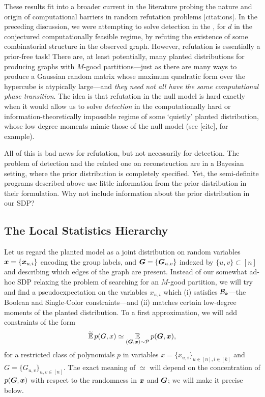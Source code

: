 These results fit into a broader current in the literature probing the nature and origin of computational barriers in random refutation problems [citations]. In the preceding discussion, we were attempting to solve detection in the \model, for $d$ in the conjectured computationally feasible regime, by refuting the existence of some combinatorial structure in the observed graph. However, refutation is essentially a prior-free task! 
There are, at least potentially, many planted distributions for producing graphs with $M$-good partitions---just as there are many ways to produce a Gaussian random matrix whose maximum quadratic form over the hypercube is atypically large---and \emph{they need not all have the same computational phase transition}. The idea is that refutation in the null model is hard exactly when it would allow us to solve \emph{detection} in the computationally hard or information-theoretically impossible regime of some `quietly' planted distribution, whose low degree moments mimic those of the null model (see [cite], for example). 

All of this is bad news for refutation, but not necessarily for detection.  The problem of detection and the related one on reconstruction are in a Bayesian setting, where the prior distribution is completely specified.
Yet, the semi-definite programs described above use little information from the prior distribution in their formulation.  Why not include information about the prior distribution in our SDP?



\subsection{The Local Statistics Hierarchy} %
\label{sub:the_local_statistics_hierarchy}

Let us regard the planted model as a joint distribution on random variables ${\boldsymbol{x}} = \{{\boldsymbol{x}}_{u,i}\}$ encoding the group labels, and $\boldsymbol{G} = \{\boldsymbol{G}_{u,v}\}$ indexed by $\{u,v\} \subset [n]$ and describing which edges of the graph are present.  Instead of our somewhat ad-hoc SDP relaxing the problem of searching for an $M$-good partition, we will try and find a pseudoexpectation on the variables $x_{u,i}$ which (i) satisfies $\mathcal{B}_k$---the Boolean and Single-Color constraints---and (ii) matches certain low-degree moments of the planted distribution. To a first approximation, we will add constraints of the form
$$
	\widetilde{\operatorname*{\mathbb{E}}}\, p(G,x) \simeq \operatorname*{\mathbb{E}}_{(\boldsymbol{G},{\boldsymbol{x}})\sim \mathcal{P}} p(\boldsymbol{G},{\boldsymbol{x}}),
$$
for a restricted class of polynomials $p$ in variables $x = \{x_{u,i}\}_{u\in [n], i \in [k]}$ and $G = \{G_{u,v}\}_{u,v\in[n]}$. The exact meaning of $\simeq$ will depend on the concentration of $p(\boldsymbol{G},{\boldsymbol{x}})$ with respect to the randomness in ${\boldsymbol{x}}$ and $\boldsymbol{G}$; we will make it precise below.

